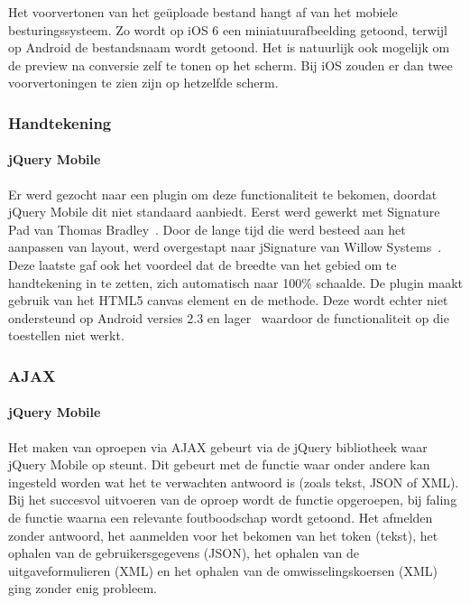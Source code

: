 Het voorvertonen van het geüploade bestand hangt af van het mobiele besturingssysteem.
Zo wordt op iOS 6 een miniatuurafbeelding getoond, terwijl op Android de bestandsnaam wordt getoond.
Het is natuurlijk ook mogelijk om de preview na conversie zelf te tonen op het scherm.
Bij iOS zouden er dan twee voorvertoningen te zien zijn op hetzelfde scherm.

\subsubsection{Handtekening}

\paragraph{jQuery Mobile} 
Er werd gezocht naar een plugin om deze functionaliteit te bekomen, doordat jQuery Mobile dit niet standaard aanbiedt. 
Eerst werd gewerkt met Signature Pad van Thomas Bradley~\cite{Bradley2013}. 
Door de lange tijd die werd besteed aan het aanpassen van layout, werd overgestapt naar jSignature van Willow Systems~\cite{Systems2013}. 
Deze laatste gaf ook het voordeel dat de breedte van het gebied om te handtekening in te zetten, zich automatisch naar 100\% schaalde. 
De plugin maakt gebruik van het HTML5 canvas element en de  methode.
Deze wordt echter niet ondersteund op Android versies 2.3 en lager~\cite{Systems2013} waardoor de functionaliteit op die toestellen niet werkt.

\subsubsection{AJAX}

\paragraph{jQuery Mobile} 
Het maken van oproepen via AJAX gebeurt via de jQuery bibliotheek waar jQuery Mobile op steunt. 
Dit gebeurt met de functie  waar onder andere kan ingesteld worden wat het te verwachten antwoord is (zoals tekst, JSON of XML). 
Bij het succesvol uitvoeren van de oproep wordt de  functie opgeroepen, bij faling de  functie waarna een relevante foutboodschap wordt getoond.
Het afmelden zonder antwoord, het aanmelden voor het bekomen van het token (tekst), het ophalen van de gebruikersgegevens (JSON), het ophalen van de uitgaveformulieren (XML) en het ophalen van de omwisselingskoersen (XML) ging zonder enig probleem.

